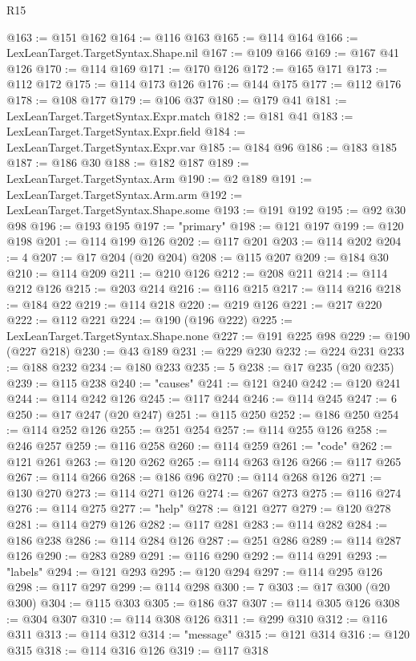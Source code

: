 \begin{lexlean}{R15}
\begin{coremodule}
@163 := @151 @162
@164 := @116 @163
@165 := @114 @164
@166 := LexLeanTarget.TargetSyntax.Shape.nil
@167 := @109 @166
@169 := @167 @41 @126
@170 := @114 @169
@171 := @170 @126
@172 := @165 @171
@173 := @112 @172
@175 := @114 @173 @126
@176 := @144 @175
@177 := @112 @176
@178 := @108 @177
@179 := @106 @37
@180 := @179 @41
@181 := LexLeanTarget.TargetSyntax.Expr.match
@182 := @181 @41
@183 := LexLeanTarget.TargetSyntax.Expr.field
@184 := LexLeanTarget.TargetSyntax.Expr.var
@185 := @184 @96
@186 := @183 @185
@187 := @186 @30
@188 := @182 @187
@189 := LexLeanTarget.TargetSyntax.Arm
@190 := @2 @189
@191 := LexLeanTarget.TargetSyntax.Arm.arm
@192 := LexLeanTarget.TargetSyntax.Shape.some
@193 := @191 @192
@195 := @92 @30 @98
@196 := @193 @195
@197 := "primary"
@198 := @121 @197
@199 := @120 @198
@201 := @114 @199 @126
@202 := @117 @201
@203 := @114 @202
@204 := 4
@207 := @17 @204 (@20 @204)
@208 := @115 @207
@209 := @184 @30
@210 := @114 @209
@211 := @210 @126
@212 := @208 @211
@214 := @114 @212 @126
@215 := @203 @214
@216 := @116 @215
@217 := @114 @216
@218 := @184 @22
@219 := @114 @218
@220 := @219 @126
@221 := @217 @220
@222 := @112 @221
@224 := @190 (@196 @222)
@225 := LexLeanTarget.TargetSyntax.Shape.none
@227 := @191 @225 @98
@229 := @190 (@227 @218)
@230 := @43 @189
@231 := @229 @230
@232 := @224 @231
@233 := @188 @232
@234 := @180 @233
@235 := 5
@238 := @17 @235 (@20 @235)
@239 := @115 @238
@240 := "causes"
@241 := @121 @240
@242 := @120 @241
@244 := @114 @242 @126
@245 := @117 @244
@246 := @114 @245
@247 := 6
@250 := @17 @247 (@20 @247)
@251 := @115 @250
@252 := @186 @250
@254 := @114 @252 @126
@255 := @251 @254
@257 := @114 @255 @126
@258 := @246 @257
@259 := @116 @258
@260 := @114 @259
@261 := "code"
@262 := @121 @261
@263 := @120 @262
@265 := @114 @263 @126
@266 := @117 @265
@267 := @114 @266
@268 := @186 @96
@270 := @114 @268 @126
@271 := @130 @270
@273 := @114 @271 @126
@274 := @267 @273
@275 := @116 @274
@276 := @114 @275
@277 := "help"
@278 := @121 @277
@279 := @120 @278
@281 := @114 @279 @126
@282 := @117 @281
@283 := @114 @282
@284 := @186 @238
@286 := @114 @284 @126
@287 := @251 @286
@289 := @114 @287 @126
@290 := @283 @289
@291 := @116 @290
@292 := @114 @291
@293 := "labels"
@294 := @121 @293
@295 := @120 @294
@297 := @114 @295 @126
@298 := @117 @297
@299 := @114 @298
@300 := 7
@303 := @17 @300 (@20 @300)
@304 := @115 @303
@305 := @186 @37
@307 := @114 @305 @126
@308 := @304 @307
@310 := @114 @308 @126
@311 := @299 @310
@312 := @116 @311
@313 := @114 @312
@314 := "message"
@315 := @121 @314
@316 := @120 @315
@318 := @114 @316 @126
@319 := @117 @318

\end{coremodule}
\end{lexlean}
